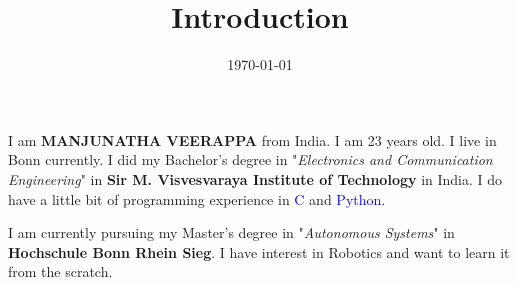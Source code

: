 \documentclass[11pt]{article}
\title{\textbf{Introduction}}
\author{}
\date{\today}
\begin{document}
\maketitle
I am \MakeUppercase{\textbf{Manjunatha Veerappa}} from India. I am 23 years old. I live in Bonn currently. I did my Bachelor's degree in "\textit{Electronics and Communication Engineering}" in \textbf{Sir M. Visvesvaraya Institute of Technology} in India.
I do have a little bit of programming experience in \textcolor{blue}{C} and \textcolor{blue}{Python}. 

I am currently pursuing my Master's degree in "\textit{Autonomous Systems}" in \textbf{Hochschule Bonn Rhein Sieg}. I have interest in Robotics and want to learn it from the scratch.
\end{document}

